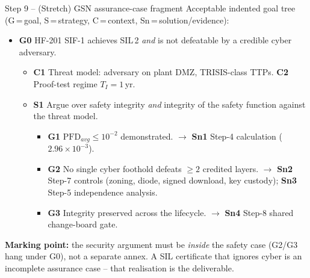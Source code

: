 \documentclass[11pt,a4paper]{article}
\begin{document}
\begin{solutionbox}{Step 9 -- (Stretch) GSN assurance-case fragment}
Acceptable indented goal tree (G\,=\,goal, S\,=\,strategy, C\,=\,context,
Sn\,=\,solution/evidence):
\begin{itemize}[leftmargin=*, nosep]
  \item \textbf{G0} HF-201 SIF-1 achieves SIL\,2 \emph{and} is not defeatable
        by a credible cyber adversary.
  \begin{itemize}[leftmargin=1.2em, nosep]
    \item \textbf{C1} Threat model: adversary on plant DMZ, TRISIS-class TTPs.
          \quad \textbf{C2} Proof-test regime $T_I=1$\,yr.
    \item \textbf{S1} Argue over safety integrity \emph{and} integrity of the
          safety function against the threat model.
    \begin{itemize}[leftmargin=1.2em, nosep]
      \item \textbf{G1} $\mathrm{PFD}_{avg}\le10^{-2}$ demonstrated.
            $\to$ \textbf{Sn1} Step-4 calculation ($2.96\times10^{-3}$).
      \item \textbf{G2} No single cyber foothold defeats $\geq2$ credited
            layers. $\to$ \textbf{Sn2} Step-7 controls (zoning, diode, signed
            download, key custody); \textbf{Sn3} Step-5 independence analysis.
      \item \textbf{G3} Integrity preserved across the lifecycle. $\to$
            \textbf{Sn4} Step-8 shared change-board gate.
    \end{itemize}
  \end{itemize}
\end{itemize}
\textbf{Marking point:} the security argument must be \emph{inside} the safety
case (G2/G3 hang under G0), not a separate annex. A SIL certificate that
ignores cyber is an incomplete assurance case -- that realisation is the
deliverable.
\end{solutionbox}
\end{document}
